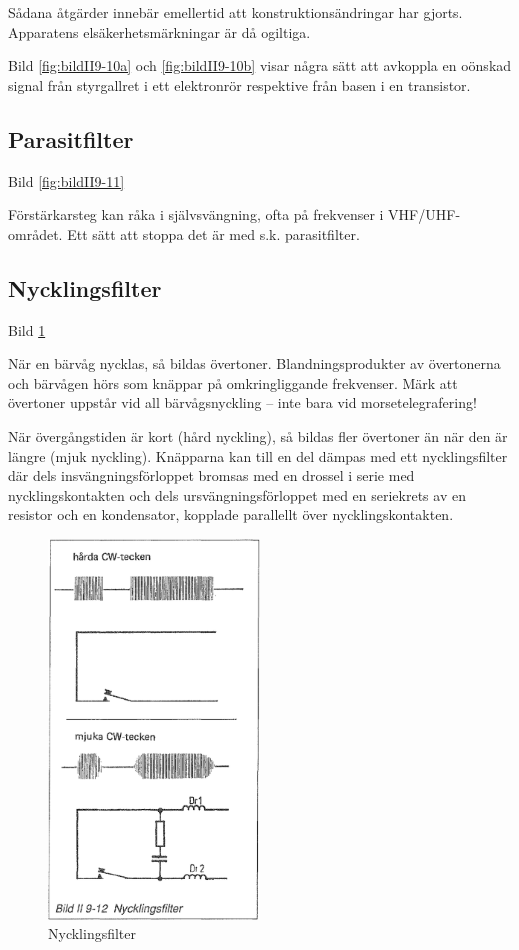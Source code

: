 Sådana åtgärder innebär emellertid att konstruktionsändringar har
gjorts. Apparatens elsäkerhetsmärkningar är då ogiltiga.

Bild \ref{fig:bildII9-10a} och \ref{fig:bildII9-10b} visar några sätt att avkoppla en oönskad signal från styrgallret i ett elektronrör respektive från basen i en
transistor.

\subsection{Parasitfilter}

Bild \ref{fig:bildII9-11}

Förstärkarsteg kan råka i självsvängning, ofta på frekvenser i
VHF/UHF-området. Ett sätt att stoppa det är med s.k. parasitfilter.

\subsection{Nycklingsfilter}

Bild \ref{fig:bildII9-12}

När en bärvåg nycklas, så bildas övertoner.  Blandningsprodukter av
övertonerna och bärvågen hörs som knäppar på omkringliggande
frekvenser. Märk att övertoner uppstår vid all bärvågsnyckling -- inte
bara vid morsetelegrafering!

När övergångstiden är kort (hård nyckling), så bildas fler övertoner
än när den är längre (mjuk nyckling). Knäpparna kan till en del dämpas
med ett nycklingsfilter där dels insvängningsförloppet bromsas med en
drossel i serie med nycklingskontakten och dels ursvängningsförloppet
med en seriekrets av en resistor och en kondensator, kopplade
parallellt över nycklingskontakten.

\begin{figure}
  \includegraphics[width=0.5\textwidth]{images/bild_2_9-12}
  \caption{Nycklingsfilter}
  \label{fig:bildII9-12}
\end{figure}

